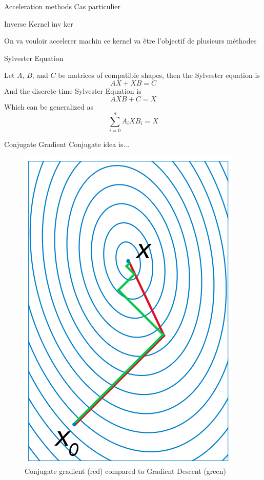 \documentclass[compress]{beamer}
\begin{document}
\begin{frame}{Acceleration methods}
Cas particulier
\begin{block}{Inverse Kernel}
	inv ker 
\end{block}
On va vouloir accelerer machin
ce kernel va être l'objectif de plusieurs méthodes
\end{frame}
\begin{frame}{Sylvester Equation}
\begin{definition}
	Let $A$, $B$, and $C$ be matrices of compatible shapes, then the Sylvester equation is
	\begin{equation*}
	AX+XB=C
	\end{equation*}
	And the discrete-time Sylvester Equation is 
	\begin{equation*}
	AXB+C=X
	\end{equation*}
	Which can be generalized as
	\begin{equation*}
	\sum_{i=0}^{d}A_{i}XB_{i}=X
	\end{equation*}
\end{definition}
\end{frame}
\begin{frame}{Conjugate Gradient}
	Conjugate idea is...
	\begin{figure}[!htb]
		\centering
		\includegraphics[height=0.3\textheight]{data/sota/conj_grad.png}
		\caption{Conjugate gradient (red) compared to Gradient Descent (green)}
		\label{fig:conj_grad}
	\end{figure} 
\end{frame}
\end{document}
